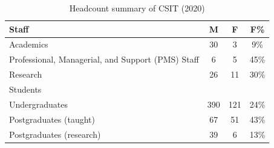 \begin{table}[!htb]
\colorbox{orangebg}{
      \begin{minipage}{11.0cm}

\caption{Headcount summary of CSIT (2020)}
\label{tab:headcount}
\footnotesize   
\begin{tabular}{p{8cm} 
                S[table-format=3.0]
                !{\qquad}
                S[table-format=3.0]
                !{\qquad}
                S[table-format=2.0\%]} 

\toprule 
Staff & {M} & {F} & {F\%} \\
\midrule 
Academics & 30 & 3 & 9\%\\
Professional, Managerial, and Support (PMS) Staff & 6 & 5 & 45\%\\
Research & 26 & 11 & 30\%\\
\midrule
Students\\
\midrule 
Undergraduates & 390 & 121 & 24\%\\
Postgraduates (taught) & 67 & 51 & 43\%\\
Postgraduates (research) & 39 & 6 & 13\%\\

\bottomrule 
\end{tabular}

\end{minipage}
}


\end{table}